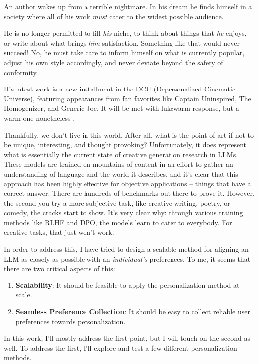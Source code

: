 \documentclass[11pt]{article}
\begin{document}
An author wakes up from a terrible nightmare.  In his dream he finds himself in a society where all of his work \emph{must} cater to the widest possible audience. 

He is no longer permitted to fill \emph{his} niche, to think about things that \emph{he} enjoys, or write about what brings \emph{him} satisfaction. Something like that would never succeed! No, he must take care to inform himself on what is currently popular, adjust his own style accordingly, and never deviate beyond the safety of conformity.

His latest work is a new installment in the DCU (Depersonalized Cinematic Universe), featuring appearances from fan favorites like Captain Uninspired, The Homogenizer, and Generic Joe. It will be met with lukewarm response, but a warm one nonetheless \cite{lockhartslament}. 

Thankfully, we don't live in this world. After all, what is the point of art if not to be unique, interesting, and thought provoking? Unfortunately, it does represent what is essentially the current state of creative generation research in LLMs. These models are trained on mountains of content in an effort to gather an understanding of language and the world it describes, and it's clear that this approach has been highly effective for objective applications -- things that have a correct answer. There are hundreds of benchmarks out there to prove it. However, the second you try a more subjective task, like creative writing, poetry, or comedy, the cracks start to show. It's very clear why: through various training methods like RLHF and DPO, the models learn to cater to everybody. For creative tasks, that just won't work.

In order to address this, I have tried to design a scalable method for aligning an LLM as closely as possible with an \emph{individual's} preferences. To me, it seems that there are two critical aspects of this:

\begin{enumerate}
    \item \textbf{Scalability}: It should be feasible to apply the personalization method at scale.
    \item \textbf{Seamless Preference Collection}: It should be easy to collect reliable user preferences towards personalization.
\end{enumerate}

In this work, I'll mostly address the first point, but I will touch on the second as well. To address the first, I'll explore and test a few different personalization methods.
\end{document}
